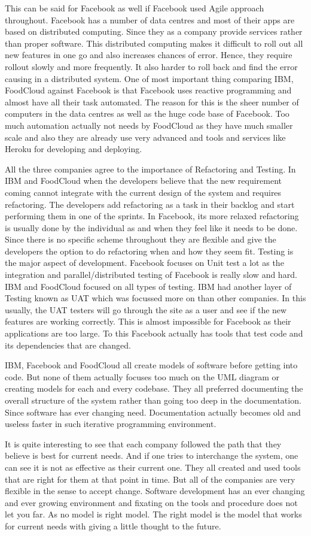 This can be said for Facebook as well if Facebook used Agile approach throughout. Facebook has a number of data centres and most of their apps are based on distributed computing. Since they as a company provide services rather than proper software. This distributed computing makes it difficult to roll out all new features in one go and also increases chances of error. Hence, they require rollout slowly and more frequently. It also harder to roll back and find the error causing in a distributed system. One of most important thing comparing IBM, FoodCloud against Facebook is that Facebook uses reactive programming and almost have all their task automated. The reason for this is the sheer number of computers in the data centres as well as the huge code base of Facebook. Too much automation actually not needs by FoodCloud as they have much smaller scale and also they are already use very advanced and tools and services like Heroku for developing and deploying. 

All the three companies agree to the importance of Refactoring and Testing. In IBM and FoodCloud when the developers believe that the new requirement coming cannot integrate with the current design of the system and requires refactoring. The developers add refactoring as a task in their backlog and start performing them in one of the sprints. In Facebook, its more relaxed refactoring is usually done by the individual as and when they feel like it needs to be done. Since there is no specific scheme throughout they are flexible and give the developers the option to do refactoring when and how they seem fit. Testing is the major aspect of development. Facebook focuses on Unit test a lot as the integration and parallel/distributed testing of Facebook is really slow and hard. IBM and FoodCloud focused on all types of testing. IBM had another layer of Testing known as UAT which was focussed more on than other companies. In this usually, the UAT testers will go through the site as a user and see if the new features are working correctly. This is almost impossible for Facebook as their applications are too large. To this Facebook actually has tools that test code and its dependencies that are changed.

IBM, Facebook and FoodCloud all create models of software before getting into code. But none of them actually focuses too much on the UML diagram or creating models for each and every codebase. They all preferred documenting the overall structure of the system rather than going too deep in the documentation. Since software has ever changing need. Documentation actually becomes old and useless faster in such iterative programming environment.

It is quite interesting to see that each company followed the path that they believe is best for current needs. And if one tries to interchange the system, one can see it is not as effective as their current one. They all created and used tools that are right for them at that point in time. But all of the companies are very flexible in the sense to accept change. Software development has an ever changing and ever growing environment and fixating on the tools and procedure does not let you far. As no model is right model. The right model is the model that works for current needs with giving a little thought to the future.
